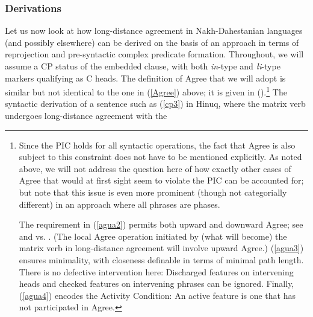 \documentclass[output=paper
,modfonts
,nonflat]{langsci/langscibook}
\begin{document}
	\subsubsection{Derivations}
	
	Let us now look at how long-distance agreement in Nakh-Dahestanian
	languages (and possibly elsewhere) can be derived on the basis of an
	approach in terms of reprojection and pre-syntactic complex predicate
	formation. Throughout, we will assume a CP status of the embedded
	clause, with both  {\itshape \textcrlambda in}-type and {\itshape {\l}i}-type
	markers qualifying as C heads. The definition of Agree that we will
	adopt is similar but not identical to the one in (\ref{Agree}) above; it
	is given in (\Next).\footnote{Since the PIC holds for all syntactic
		operations, the fact that Agree is also subject to this constraint
		does not have to be mentioned explicitly. As noted above, we will
		not address the question here of how exactly other cases of Agree that
		would at first sight seem to violate the PIC can be accounted for;
		but note that this issue is even more prominent (though not
		categorially different) in an approach where all phrases are
		phases. 
		
		The requirement in (\ref{agua2}) permits both upward and downward Agree; see
		\citet{Zeijlstra:12} and \citet{BjorkmanZeijlstra:14} vs. \citet{Preminger:13:tha}.
		(The local Agree operation initiated by (what will become) the matrix verb in
		long-distance agreement will involve upward Agree.) (\ref{agua3})
		ensures minimality, with closeness definable in terms of minimal path
		length. There is no defective intervention here: Discharged
		features on intervening  heads and checked features on intervening phrases can be ignored. Finally,
		(\ref{agua4}) encodes the Activity Condition: An active feature is one
		that has not participated in Agree.}
\newpage	{}
	The syntactic derivation of a sentence such as (\ref{cp3}) in Hinuq,
	where the matrix verb undergoes long-distance agreement with the
\end{document}
